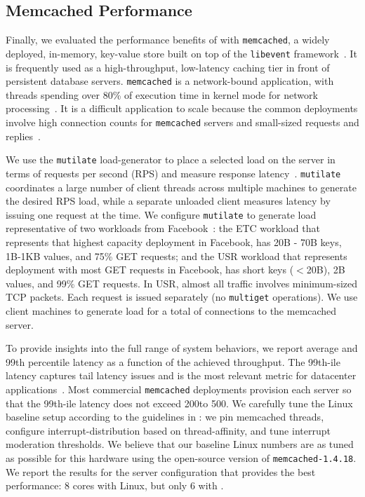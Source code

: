 

\subsection{Memcached Performance}
\label{sec:eval:memcached}



Finally, we evaluated the performance benefits of \ix with
\texttt{memcached}, a widely deployed, in-memory, key-value store built
on top of the \texttt{libevent} framework~\cite{url:memcached}. It is
frequently used as a high-throughput, low-latency caching tier in
front of persistent database servers. \texttt{memcached} is a
network-bound application, with threads spending over 80\% of
execution time in kernel mode for network
processing~\cite{DBLP:conf/eurosys/LeverichK14}. It is a difficult
application to scale because the common deployments involve high
connection counts for \texttt{memcached} servers and small-sized
requests and
replies~\cite{Atikoglu:2012:WAL,DBLP:conf/nsdi/NishtalaFGKLLMPPSSTV13}.



We use the \texttt{mutilate} load-generator to place a selected load
on the server in terms of requests per second (RPS) and measure
response latency~\cite{url:mutilate}. \texttt{mutilate} coordinates a
large number of client threads across multiple machines to generate
the desired RPS load, while a separate unloaded client measures
latency by issuing one request at the time.  We configure
\texttt{mutilate} to generate load representative of two workloads
from Facebook~\cite{Atikoglu:2012:WAL}: the ETC workload that
represents that highest capacity deployment in Facebook, has 20B - 70B
keys, 1B-1KB values, and 75\% GET requests; and the USR workload that
represents deployment with most GET requests in Facebook, has short
keys ($<$20B), 2B values, and 99\% GET requests. In USR, almost all
traffic involves minimum-sized TCP packets. Each request is issued
separately (no \texttt{multiget} operations).  We use 
client machines to generate load for a total of
 connections to the memcached server.

To provide insights into the full range of system behaviors, we report
average and 99th percentile latency as a function of the achieved
throughput. The 99th-ile latency captures tail latency issues and is
the most relevant metric for datacenter
applications~\cite{DBLP:journals/cacm/DeanB13}. Most commercial
\texttt{memcached} deployments provision each server so that the
99th-ile latency does not exceed 200\microsecond to 500\microsecond.
We carefully tune the Linux baseline setup according to the guidelines
in \cite{DBLP:conf/eurosys/LeverichK14}: we pin memcached threads,
configure interrupt-distribution based on thread-affinity, and tune
interrupt moderation thresholds. We believe that our baseline Linux
numbers are as tuned as possible for this hardware using the
open-source version of \texttt{memcached-1.4.18}. We report the
results for the server configuration that provides the best
performance: 8 cores with Linux, but only 6 with \ix.

